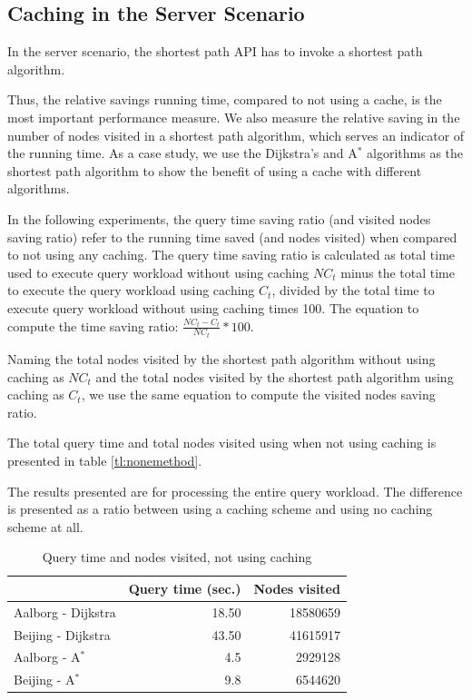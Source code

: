 \subsection{Caching in the Server Scenario}\label{subsec:expServer}
%
In the server scenario, the shortest path API has to invoke a shortest path algorithm.
{\color{red}
Thus, the relative savings running time, compared to not using a cache, is the most important performance measure. We also measure the relative saving in the number of nodes visited in a shortest path algorithm, which serves an indicator of the running time.
As a case study, we use the Dijkstra's and A$^*$ algorithms as the shortest path algorithm to show the benefit of using a \spath cache with different \spath algorithms.

In the following experiments, the query time saving ratio (and visited nodes saving ratio) refer to the running time saved (and nodes visited) when compared to not using any caching. 
The query time saving ratio is calculated as total time used to execute query workload without using caching $NC_t$ minus the total time to execute the query workload using caching $C_t$, divided by the total time to execute query workload without using caching times 100. The equation to compute the time saving ratio: $ \frac{NC_t - C_t}{NC_t}*100$.

Naming the total nodes visited by the shortest path algorithm without using caching as $NC_t$ and the total nodes visited by the shortest path algorithm using caching as $C_t$, we use the same equation to compute the visited nodes saving ratio.

The total query time and total nodes visited using when not using caching is presented in table \ref{tl:nonemethod}.

The results presented are for processing the entire query workload. The difference is presented as a ratio between using a caching scheme and using no caching scheme at all.
}




\begin{table}[htb]
\center
\begin{tabular}{|l|r|r|}\hline
 & Query time (sec.) & Nodes visited \\\hline \hline
Aalborg - Dijkstra & 18.50 & 18580659 \\\hline
Beijing - Dijkstra & 43.50 & 41615917 \\\hline
Aalborg - A$^*$ & 4.5 & 2929128 \\\hline 
Beijing - A$^*$ & 9.8 & 6544620 \\\hline
\end{tabular}
\caption{Query time and nodes visited, not using caching}
\label{tbl:nonemethod}
\end{table}



